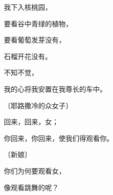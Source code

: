 {\par }{\Q {}我下入核桃园，
\par }{\Q 要看谷中青绿的植物，
\par }{\Q 要看葡萄发芽没有，
\par }{\Q 石榴开花没有。
\par }{\Q {}不知不觉，
\par }{\Q 我的心将我安置在我尊长的车中。
\par }{\SP 〔耶路撒冷的众女子〕
\par }{\Q {}回来，回来，{}女；
\par }{\Q 你回来，你回来，使我们得观看你。
\par }{\SP 〔新娘〕
\par }{\Q 你们为何要观看{}女，
\par }{\Q 像观看{}跳舞的呢？

}
